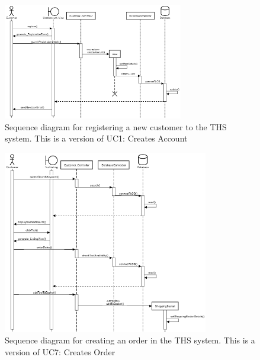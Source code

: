 \documentclass[fontsize=11pt]{extarticle}
\numberwithin{figure}{section} %
\numberwithin{table}{section}%
\begin{document}
\begin{figure}[H]
      \centering
      \includegraphics[trim = 0 0 0 0, clip, width=0.7\textwidth]{TempImg/new_user_reg_SD.png}
      \caption{Sequence diagram for registering a new customer to the THS system. This is a version of UC1: Creates Account}
\end{figure}

\begin{figure}[H]
      \centering
      \includegraphics[trim = 0 0 0 0, clip, width=0.8\textwidth]{TempImg/create_order_SD.png}
      \caption{Sequence diagram for creating an order in the THS system. This is a version of UC7: Creates Order}
\end{figure}
\end{document}
